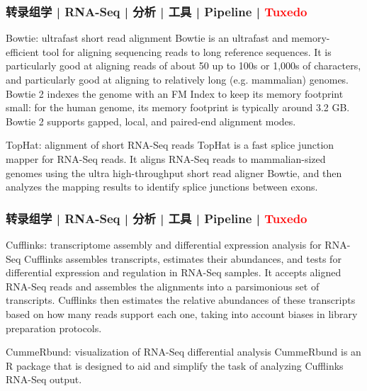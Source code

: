 \begin{frame}
  \frametitle{转录组学 | RNA-Seq | 分析 | 工具 | Pipeline | \textcolor{red}{Tuxedo}}
  \begin{block}{Bowtie: ultrafast short read alignment}
    Bowtie is an ultrafast and memory-efficient tool for aligning sequencing reads to long reference sequences. It is particularly good at aligning reads of about 50 up to 100s or 1,000s of characters, and particularly good at aligning to relatively long (e.g. mammalian) genomes. Bowtie 2 indexes the genome with an FM Index to keep its memory footprint small: for the human genome, its memory footprint is typically around 3.2 GB. Bowtie 2 supports gapped, local, and paired-end alignment modes.
  \end{block}
  \pause
  \begin{block}{TopHat: alignment of short RNA-Seq reads}
    TopHat is a fast splice junction mapper for RNA-Seq reads. It aligns RNA-Seq reads to mammalian-sized genomes using the ultra high-throughput short read aligner Bowtie, and then analyzes the mapping results to identify splice junctions between exons.
  \end{block}
\end{frame}

\begin{frame}
  \frametitle{转录组学 | RNA-Seq | 分析 | 工具 | Pipeline | \textcolor{red}{Tuxedo}}
  \begin{block}{Cufflinks: transcriptome assembly and differential expression analysis for RNA-Seq}
    Cufflinks assembles transcripts, estimates their abundances, and tests for differential expression and regulation in RNA-Seq samples. It accepts aligned RNA-Seq reads and assembles the alignments into a parsimonious set of transcripts. Cufflinks then estimates the relative abundances of these transcripts based on how many reads support each one, taking into account biases in library preparation protocols.
  \end{block}
  \pause
  \begin{block}{CummeRbund: visualization of RNA-Seq differential analysis}
    CummeRbund is an R package that is designed to aid and simplify the task of analyzing Cufflinks RNA-Seq output.
  \end{block}
\end{frame}

